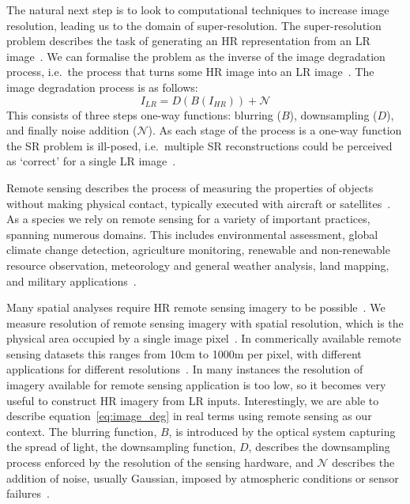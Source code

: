 The natural next step is to look to computational techniques to increase image resolution, leading us to the domain of super-resolution. The super-resolution problem describes the task of generating an HR representation from an LR image~\cite{ref}. We can formalise the problem as the inverse of the image degradation process, i.e.\ the process that turns some HR image into an LR image~\cite{imageDeg}. The image degradation process is as follows:
\begin{equation}\label{eq:image_deg}
    I_{LR} = D(B(I_{HR})) + \mathcal{N}
\end{equation}
This consists of three steps one-way functions: blurring ($B$), downsampling ($D$), and finally noise addition ($\mathcal{N}$). As each stage of the process is a one-way function the SR problem is ill-posed, i.e.\ multiple SR reconstructions could be perceived as `correct' for a single LR image~\cite{ref}.

Remote sensing describes the process of measuring the properties of objects without making physical contact, typically executed with aircraft or satellites~\cite{remoteSensing,remoteSensingImageProcessing}. As a species we rely on remote sensing for a variety of important practices, spanning numerous domains. This includes environmental assessment, global climate change detection, agriculture monitoring, renewable and non-renewable resource observation, meteorology and general weather analysis, land mapping, and military applications~\cite{remoteSensingImageProcessing, remoteSensingUses, remoteSensingGANsReview}.

Many spatial analyses require HR remote sensing imagery to be possible~\cite{ref}. We measure resolution of remote sensing imagery with spatial resolution, which is the physical area occupied by a single image pixel~\cite{ref}. In commerically available remote sensing datasets this ranges from 10cm to 1000m per pixel, with different applications for different resolutions~\cite{remoteSensingImageProcessing}. In many instances the resolution of imagery available for remote sensing application is too low, so it becomes very useful to construct HR imagery from LR inputs. Interestingly, we are able to describe equation~\ref{eq:image_deg} in real terms using remote sensing as our context. The blurring function, $B$, is introduced by the optical system capturing the spread of light, the downsampling function, $D$, describes the downsampling process enforced by the resolution of the sensing hardware, and $\mathcal{N}$ describes the addition of noise, usually Gaussian, imposed by atmospheric conditions or sensor failures~\cite{superResRemoteSensingOverview,superResRemoteSensingChallenges, remoteSensingDeepLearningReview, remoteSensingGANsReview}.

